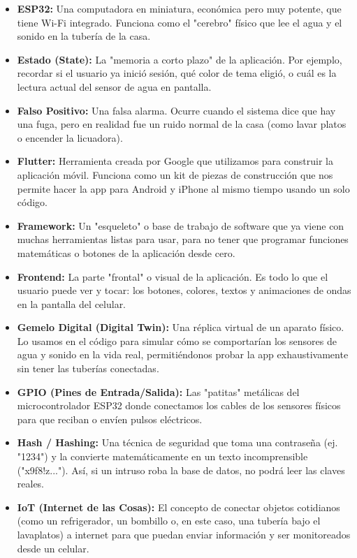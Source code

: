 \documentclass[11pt,a4paper]{article}
\begin{document}
\begin{itemize}
    \item \textbf{ESP32:} Una computadora en miniatura, económica pero muy potente, que tiene Wi-Fi integrado. Funciona como el "cerebro" físico que lee el agua y el sonido en la tubería de la casa.
    \item \textbf{Estado (State):} La "memoria a corto plazo" de la aplicación. Por ejemplo, recordar si el usuario ya inició sesión, qué color de tema eligió, o cuál es la lectura actual del sensor de agua en pantalla.
    \item \textbf{Falso Positivo:} Una falsa alarma. Ocurre cuando el sistema dice que hay una fuga, pero en realidad fue un ruido normal de la casa (como lavar platos o encender la licuadora).
    \item \textbf{Flutter:} Herramienta creada por Google que utilizamos para construir la aplicación móvil. Funciona como un kit de piezas de construcción que nos permite hacer la app para Android y iPhone al mismo tiempo usando un solo código.
    \item \textbf{Framework:} Un "esqueleto" o base de trabajo de software que ya viene con muchas herramientas listas para usar, para no tener que programar funciones matemáticas o botones de la aplicación desde cero.
    \item \textbf{Frontend:} La parte "frontal" o visual de la aplicación. Es todo lo que el usuario puede ver y tocar: los botones, colores, textos y animaciones de ondas en la pantalla del celular.
    \item \textbf{Gemelo Digital (Digital Twin):} Una réplica virtual de un aparato físico. Lo usamos en el código para simular cómo se comportarían los sensores de agua y sonido en la vida real, permitiéndonos probar la app exhaustivamente sin tener las tuberías conectadas.
    \item \textbf{GPIO (Pines de Entrada/Salida):} Las "patitas" metálicas del microcontrolador ESP32 donde conectamos los cables de los sensores físicos para que reciban o envíen pulsos eléctricos.
    \item \textbf{Hash / Hashing:} Una técnica de seguridad que toma una contraseña (ej. "1234") y la convierte matemáticamente en un texto incomprensible ("x9f8!z..."). Así, si un intruso roba la base de datos, no podrá leer las claves reales.
    \item \textbf{IoT (Internet de las Cosas):} El concepto de conectar objetos cotidianos (como un refrigerador, un bombillo o, en este caso, una tubería bajo el lavaplatos) a internet para que puedan enviar información y ser monitoreados desde un celular.

\end{itemize}
\end{document}
